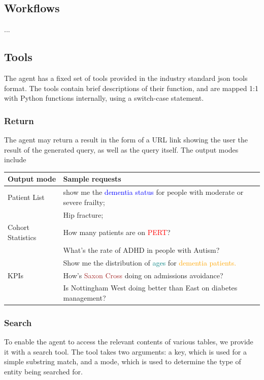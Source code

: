 \documentclass[11pt]{article}
\begin{document}

\subsection{Workflows}
...

\subsection{Tools}
The agent has a fixed set of tools provided in the industry standard json tools format.
The tools contain brief descriptions of their function, and are mapped 1:1 with Python functions internally, using a switch-case statement.

\subsubsection{Return}
The agent may return a result in the form of a URL link showing the user the result of the generated query, as well as the query itself.
The output modes include

\begin{table}[t]
\centering
\begin{tabular}{|p{2cm}|p{5cm}|}
\hline
	Output mode & Sample requests \\
\hline
\hline
	Patient List	& show me the \textcolor{blue}{dementia status} for people with moderate or severe frailty; \\
			& Hip fracture; \\ 
\hline
	Cohort Statistics 	& How many patients are on \textcolor{red}{PERT}? \\
				& What's the rate of ADHD in people with Autism? \\
				& Show me the distribution of \textcolor{teal}{ages} for \textcolor{orange}{dementia patients.} \\
\hline
	KPIs 	& How's \textcolor{brown}{Saxon Cross} doing on admissions avoidance? \\
		& Is Nottingham West doing better than East on diabetes management? \\	
\hline
\end{tabular}
	\label{tab:sample-queries}
\end{table}



\subsubsection{Search}
To enable the agent to access the relevant contents of various tables, we provide it with a search tool.
The tool takes two arguments: a key, which is used for a simple substring match, and a mode, which is used to determine the type of entity being searched
for.
\end{document}
